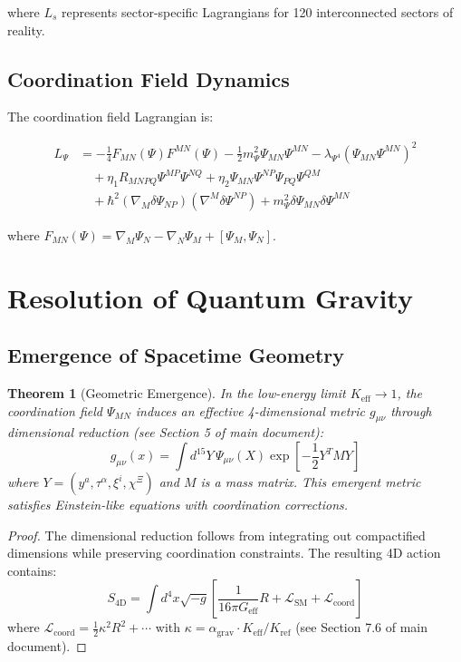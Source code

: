 \documentclass[12pt,a4paper]{article}
\newcommand{\eff}{\text{eff}}               %
\newcommand{\coord}{\text{coord}}           %
\newtheorem{theorem}{Theorem}[section]
\theoremstyle{remark}
\newcommand{\Keff}{K_{\mathrm{eff}}}
\begin{document}
	where $L_s$ represents sector-specific Lagrangians for 120 interconnected sectors of reality.
	
	\subsection{Coordination Field Dynamics}
	
	The coordination field Lagrangian is:
	
	\begin{equation}
		\begin{aligned}
			L_{\Psi} &= -\frac{1}{4} F_{MN}(\Psi) F^{MN}(\Psi)
			- \frac{1}{2} m_{\Psi}^2 \Psi_{MN} \Psi^{MN}
			- \lambda_{\Psi^4} (\Psi_{MN}\Psi^{MN})^2 \\
			&\quad + \eta_1 R_{MNPQ} \Psi^{MP} \Psi^{NQ}
			+ \eta_2 \Psi_{MN}\Psi^{NP}\Psi_{PQ}\Psi^{QM} \\
			&\quad + \hbar^2 (\nabla_M \delta\Psi_{NP})(\nabla^M \delta\Psi^{NP})
			+ m_{\Psi}^2 \delta\Psi_{MN}\delta\Psi^{MN}
		\end{aligned}
	\end{equation}
	
	where $F_{MN}(\Psi) = \nabla_M \Psi_N - \nabla_N \Psi_M + [\Psi_M, \Psi_N]$.
	
	\section{Resolution of Quantum Gravity}
	\label{sec:quantum-gravity-resolution}
	
	\subsection{Emergence of Spacetime Geometry}
	
	\begin{theorem}[Geometric Emergence]
		In the low-energy limit $\Keff \to 1$, the coordination field $\Psi_{MN}$ induces an effective 4-dimensional metric $g_{\mu\nu}$ through dimensional reduction (see Section 5 of main document):
		\[
		g_{\mu\nu}(x) = \int d^{15}Y \, \Psi_{\mu\nu}(X) \exp\left[-\frac{1}{2}Y^T M Y\right]
		\]
		where $Y = (y^a, \tau^\alpha, \xi^i, \chi^\Xi)$ and $M$ is a mass matrix. This emergent metric satisfies Einstein-like equations with coordination corrections.
	\end{theorem}
	
	\begin{proof}
		The dimensional reduction follows from integrating out compactified dimensions while preserving coordination constraints. The resulting 4D action contains:
		\[
		S_{\text{4D}} = \int d^4x \sqrt{-g} \left[ \frac{1}{16\pi G_{\eff}} R + \mathcal{L}_{\text{SM}} + \mathcal{L}_{\coord} \right]
		\]
		where $\mathcal{L}_{\coord} = \frac{1}{2}\kappa^2 R^2 + \cdots$ with $\kappa = \alpha_{\text{grav}} \cdot \Keff/K_{\text{ref}}$ (see Section 7.6 of main document).
	\end{proof}
	
\end{document}
